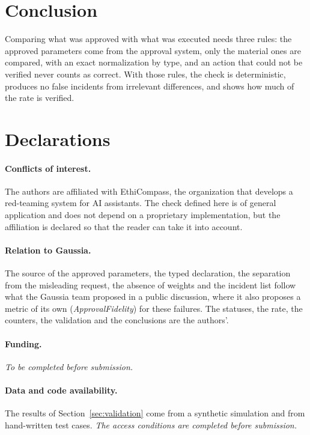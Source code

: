 \documentclass[11pt,a4paper]{article}
\begin{document}
\section{Conclusion}

Comparing what was approved with what was executed needs three rules: the approved parameters come from the
approval system, only the material ones are compared, with an exact normalization by type, and an action that
could not be verified never counts as correct. With those rules, the check is deterministic, produces no false
incidents from irrelevant differences, and shows how much of the rate is verified.

\section*{Declarations}

\paragraph{Conflicts of interest.} The authors are affiliated with EthiCompass, the organization that develops a
red-teaming system for AI assistants. The check defined
here is of general application and does not depend on a proprietary implementation, but the affiliation is
declared so that the reader can take it into account.

\paragraph{Relation to Gaussia.} The source of the approved parameters, the typed declaration, the separation
from the misleading request, the absence of weights and the incident list follow what the Gaussia team proposed
in a public discussion, where it also proposes a metric of its own (\emph{ApprovalFidelity}) for these failures.
The statuses, the rate, the counters, the validation and the conclusions are the
authors'.

\paragraph{Funding.} \textit{To be completed before submission.}

\paragraph{Data and code availability.} The results of Section~\ref{sec:validation} come from a synthetic
simulation and from hand-written test cases. \textit{The access conditions are completed before submission.}



\end{document}
